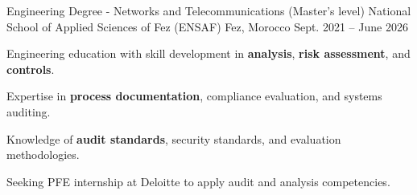 
\begin{cventries}

    \cventry
    {Engineering Degree - Networks and Telecommunications (Master's level)} %
    {National School of Applied Sciences of Fez (ENSAF)} %
    {Fez, Morocco} %
    {Sept. 2021 – June 2026} %
    {
        \begin{cvitems} %
            \item {Engineering education with skill development in \textbf{analysis}, \textbf{risk assessment}, and \textbf{controls}.}
            \item {Expertise in \textbf{process documentation}, compliance evaluation, and systems auditing.}
            \item {Knowledge of \textbf{audit standards}, security standards, and evaluation methodologies.}
            \item {Seeking PFE internship at Deloitte to apply audit and analysis competencies.}
        \end{cvitems}
    }
\end{cventries}